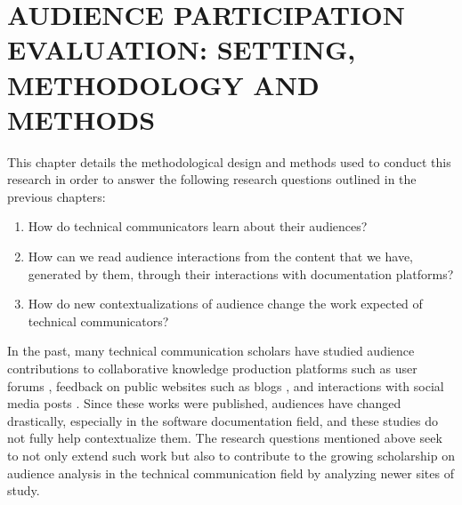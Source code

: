 \chapter{AUDIENCE PARTICIPATION EVALUATION: SETTING, METHODOLOGY AND METHODS}
\label{chap-three}

This chapter details the methodological design and methods used to conduct this research in order to answer the following research questions outlined in the previous chapters:
\begin{enumerate}
  \item How do technical communicators learn about their audiences?
  \item How can we read audience interactions from the content that we have, generated by them, through their interactions with documentation platforms?
  \item How do new contextualizations of audience change the work expected of technical communicators?
\end{enumerate}
In the past, many technical communication scholars have studied audience contributions to collaborative knowledge production platforms such as user forums \cite{swarts2007mobility, frith2017forum}, feedback on public websites such as blogs \cite{gallagher2020update}, and interactions with social media posts \cite{breuch2018involving}. Since these works were published, audiences have changed drastically, especially in the software documentation field, and these studies do not fully help contextualize them. The research questions mentioned above seek to not only extend such work but also to contribute to the growing scholarship on audience analysis in the technical communication field by analyzing newer sites of study.

